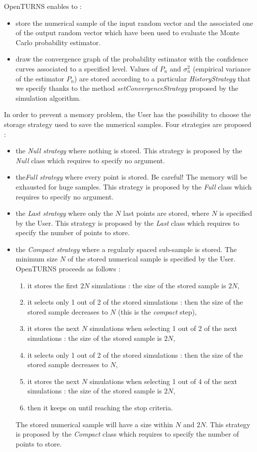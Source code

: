 OpenTURNS enables to :
\begin{itemize}
\item store the numerical sample of the input random  vector and the associated one of the output random  vector which have been used to evaluate the Monte Carlo probability estimator.
\item draw the convergence graph of the probability estimator with the confidence curves associated to a specified level. Values of $P_n$ and $\sigma_n^2$ (empirical variance of the estimator $P_n$) are stored according to a particular {\itshape HistoryStrategy} that we specify thanks to the method {\itshape setConvergenceStrategy} proposed by the simulation algorithm.
\end{itemize}
In order to prevent a memory problem, the User has the possibility to choose the storage strategy used to save the numerical samples. Four strategies are proposed :
\begin{itemize}
\item the {\itshape Null strategy} where nothing is stored. This strategy is proposed by the {\itshape Null} class which requires to specify no argument.
\item the{\itshape  Full strategy} where every point is stored. Be careful! The memory will be exhausted for huge samples. This strategy is proposed by the {\itshape Full} class which requires to specify no argument.
\item the {\itshape Last strategy} where only the $N$ last points are stored, where $N$ is specified by the User. This strategy is proposed by the {\itshape Last} class which requires to specify the number of points to store.
\item the {\itshape Compact strategy} where a regularly spaced sub-sample is stored. The minimum size $N$ of the stored numerical sample is specified by the User.  OpenTURNS proceeds as follows :
  \begin{enumerate}
  \item it stores the first $2N$ simulations : the size of the stored sample is $2N$,
  \item it selects only 1 out of 2 of the stored simulations : then the size of the stored sample decreases to $N$ (this is the {\itshape compact} step),
  \item it stores the next $N$ simulations when selecting 1 out of 2 of the next simulations : the size of the stored sample is $2N$,
  \item it selects only 1 out of 2 of the stored simulations : then the size of the stored sample decreases to $N$,
  \item it stores the next $N$ simulations when selecting 1 out of 4 of the next simulations : the size of the stored sample is $2N$,
  \item then it keeps on until  reaching the stop criteria.
  \end{enumerate}
  The stored numerical sample will have a size within $N$ and $2N$. This strategy is proposed by the {\itshape Compact} class which requires to specify the number of points to store.
\end{itemize}

